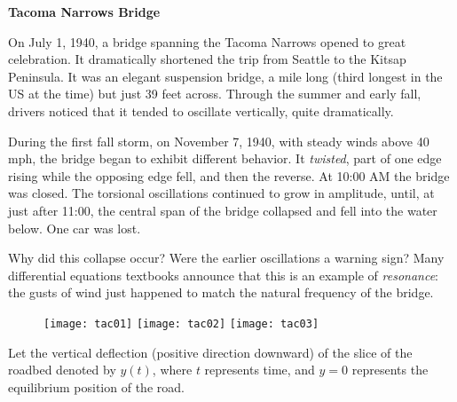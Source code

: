\documentclass{article}
\theoremstyle{definition}
\begin{document}
\thispagestyle{empty}

\begin{center}{\bf Tacoma Narrows Bridge}\end{center}

On July 1, 1940, a bridge spanning the Tacoma Narrows opened
to great celebration. It dramatically shortened the trip from Seattle
to the Kitsap Peninsula. It was an elegant suspension bridge, a mile
long (third longest in the US at the time) but just 39 feet across.
Through the summer and early fall, drivers noticed that it tended to
oscillate vertically, quite dramatically. 

During the first fall storm, on November 7, 1940, with steady winds
above 40 mph, the bridge began to exhibit different behavior. It
{\it twisted}, part of one edge rising while the opposing edge fell, and then
the reverse. At 10:00 AM the bridge was closed. The torsional oscillations continued to grow in amplitude, until, at just after 11:00, the
central span of the bridge collapsed and fell into the water below. One
car was lost.

Why did this collapse occur? Were the earlier oscillations a warning
sign? Many differential equations textbooks announce that this is an
example of {\it resonance}: the gusts of wind just happened to match the
natural frequency of the bridge.
\begin{figure}[!htb]
  \texttt{[image: tac01]}
\endminipage\hfill
{}
  \texttt{[image: tac02]}
\endminipage\hfill
{}%
  \texttt{[image: tac03]}
\endminipage
\end{figure}

Let the vertical deflection
(positive direction downward) of the slice of the roadbed denoted by $y(t)$, where $t$ represents time, and $y=0$ represents the equilibrium position of the road. 
\end{document}
